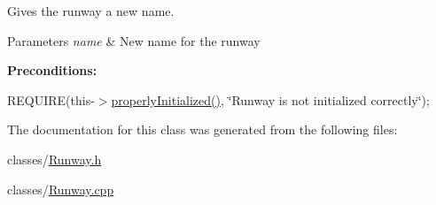 Gives the runway a new name. 


\begin{DoxyParams}{Parameters}
{\em name} & New name for the runway\\
\hline
\end{DoxyParams}
{\bfseries Preconditions\+:}
\begin{DoxyItemize}
\item R\+E\+Q\+U\+I\+RE(this-\/$>$\mbox{\hyperlink{class_runway_a360d98246cabf3aa929765f81a656348}{properly\+Initialized()}}, \char`\"{}\+Runway is not initialized correctly\char`\"{}); 
\end{DoxyItemize}

The documentation for this class was generated from the following files\+:\begin{DoxyCompactItemize}
\item 
classes/\mbox{\hyperlink{_runway_8h}{Runway.\+h}}\item 
classes/\mbox{\hyperlink{_runway_8cpp}{Runway.\+cpp}}\end{DoxyCompactItemize}
